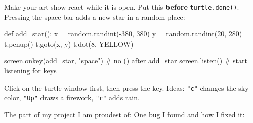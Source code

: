 \documentclass[level=1]{kidscode}
\begin{document}
\begin{stretchchallenge}
Make your art show react while it is open. Put this \textbf{before} \texttt{turtle.done()}.
Pressing the space bar adds a new star in a random place:
\begin{pycode}
def add_star():
    x = random.randint(-380, 380)
    y = random.randint(20, 280)
    t.penup()
    t.goto(x, y)
    t.dot(8, YELLOW)

screen.onkey(add_star, "space")   # no () after add_star
screen.listen()                   # start listening for keys
\end{pycode}
Click on the turtle window first, then press the key. Ideas: \texttt{"c"} changes the sky color,
\texttt{"Up"} draws a firework, \texttt{"r"} adds rain.
\end{stretchchallenge}

\begin{reflection}
The part of my project I am proudest of:
One bug I found and how I fixed it:
\end{reflection}
\end{document}
